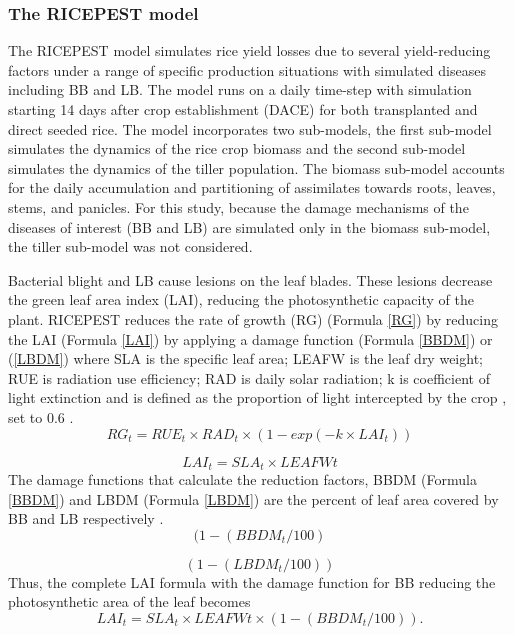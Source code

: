 \documentclass[preprint,12pt]{elsarticle}
\begin{document}
\subsubsection{The RICEPEST model}
The RICEPEST model \cite{Willocquet2000, Willocquet2002} simulates rice yield losses due to several yield-reducing factors under a range of specific production situations with simulated diseases including BB and LB. The model runs on a daily time-step with simulation starting 14 days after crop establishment (DACE) for both transplanted and direct seeded rice. The model incorporates two sub-models, the first sub-model simulates the dynamics of the rice crop biomass and the second sub-model simulates the dynamics of the tiller population. The biomass sub-model accounts for the daily accumulation and partitioning of assimilates towards roots, leaves, stems, and panicles. For this study, because the damage mechanisms of the diseases of interest (BB and LB) are simulated only in the biomass sub-model, the tiller sub-model was not considered.

Bacterial blight and LB cause lesions on the leaf blades. These lesions decrease the green leaf area index (LAI), reducing the photosynthetic capacity of the plant. RICEPEST reduces the rate of growth (RG) (Formula \ref{RG}) by reducing the LAI (Formula \ref{LAI}) by applying a damage function (Formula \ref{BBDM}) or (\ref{LBDM}) where SLA is the specific leaf area; LEAFW is the leaf dry weight; RUE is radiation use efficiency; RAD is daily solar radiation; k is coefficient of light extinction and is defined as the proportion of light intercepted by the crop \cite{Willocquet2000}, set to 0.6 \cite{Willocquet2002}.
\begin{equation}\label{RG}
RG_t = RUE_t \times RAD_t \times (1- exp(- k \times LAI_t))
\end{equation}

\begin{equation}\label{LAI}
LAI_t = SLA_t \times LEAFWt
\end{equation}
The damage functions that calculate the reduction factors, BBDM (Formula \ref{BBDM}) and LBDM (Formula \ref{LBDM}) are the percent of leaf area covered by BB and LB respectively \cite{Willocquet2002}. 
\begin{equation}\label{BBDM}
(1-(BBDM_t /100)
\end{equation}

\begin{equation}\label{LBDM}
(1-(LBDM_t /100))
\end{equation}
Thus, the complete LAI formula with the damage function for BB reducing the photosynthetic area of the leaf becomes
 \begin{equation}\label{LAIBBDM}
LAI_t = SLA_t \times LEAFWt \times (1-(BBDM_t / 100)).
\end{equation}
\end{document}
